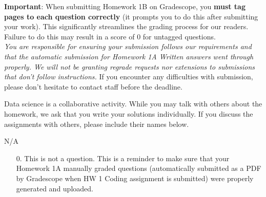 \documentclass[addpoints, 12pt]{exam}
\theoremstyle{definition}
\begin{document}
\noindent \textbf{Important}: When submitting Homework 1B on Gradescope, you \textbf{must tag pages to each question correctly} (it prompts you to do this after submitting your work). This significantly streamlines the grading process for our readers. Failure to do this may result in a score of 0 for untagged questions.\\

\noindent \textit{You are responsible for ensuring your submission follows our requirements and that the automatic submission for Homework 1A Written answers went through properly. We will not be granting regrade requests nor extensions to submissions that don't follow instructions.} If you encounter any difficulties with submission, please don't hesitate to contact staff before the deadline.

\vspace{.25in}

\vspace{.25in}



\noindent Data science is a collaborative activity. While you may talk with others about the homework, we ask that you write your solutions individually. If you discuss the assignments with others, please include their names below.

N/A

\vspace{.25in} 
\newpage



\begin{itemize}[leftmargin=0.3in]
  \item[0.] This is not a question. This is a reminder to make sure that your Homework 1A manually graded questions (automatically submitted as a PDF by Gradescope when HW 1 Coding assignment is submitted) were properly generated and uploaded. 
\end{itemize}
\end{document}
